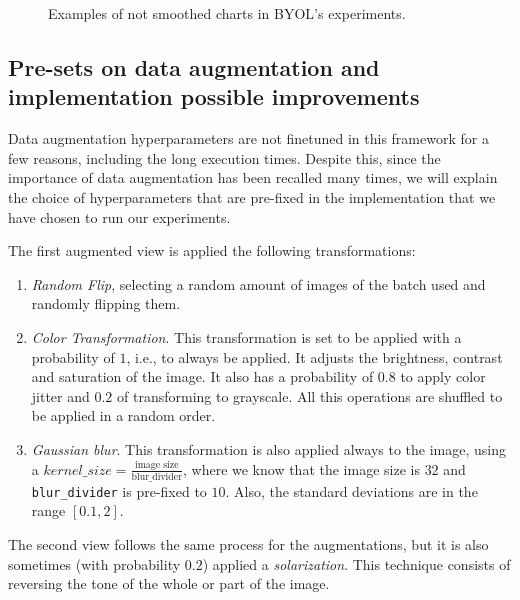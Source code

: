 \begin{figure}[htp] 
    \centering
    \hfill%
        \caption{Examples of not smoothed charts in BYOL's experiments. }
        \label{fig:byol:not:smoothed}
\end{figure}

\subsection{Pre-sets on data augmentation and implementation possible improvements}
\label{byol:preset}

Data augmentation hyperparameters are not finetuned in this framework for a few reasons, including the long execution times. Despite this, since the importance of data augmentation has been recalled many times, we will explain the choice of hyperparameters that are pre-fixed in the implementation that we have chosen to run our experiments.

The first augmented view is applied the following transformations:
\begin{enumerate}
\item \emph{Random Flip}, selecting a random amount of images of the batch used and randomly flipping them.
\item \emph{Color Transformation}. This transformation is set to be applied with a probability of $1$, i.e., to always be applied. It adjusts the brightness, contrast and saturation of the image. It also has a probability of $0.8$ to apply color jitter and $0.2$ of transforming to grayscale. All this operations are shuffled to be applied in a random order.

\item \emph{Gaussian blur}. This transformation is also applied always to the image, using a $kernel\_size = \frac{\text{image size}}{\text{blur\_divider}}$, where we know that the image size is $32$ and \lstinline{blur_divider} is pre-fixed to $10$. Also, the standard deviations are in the range $[0.1,2]$.
\end{enumerate}

The second view follows the same process for the augmentations, but it is also sometimes (with probability $0.2$) applied a \emph{solarization}. This technique consists of reversing the tone of the whole or part of the image.


